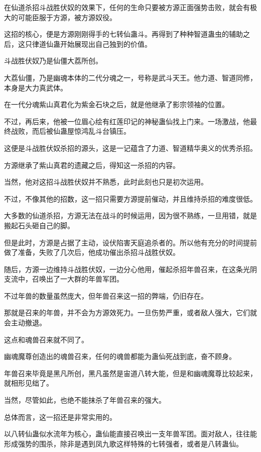 
\begin{this_body}

在仙道杀招斗战胜伏奴的效果下，任何的生命只要被方源正面强势击败，就会有极大的可能臣服于方源，被方源奴役。

这招的核心，便是方源刚刚得手的七转仙蛊斗。再得到了种种智道蛊虫的辅助之后，这只律道仙蛊开始展现出自己独到的价值。

斗战胜伏奴乃是仙僵大荔所创。

大荔仙僵，乃是幽魂本体的二代分魂之一，号称是武斗天王。他力道、智道同修，本身是大力真武体。

在一代分魂紫山真君化为紫金石块之后，就是他继承了影宗领袖的位置。

不过，再后来，他被一位眉心绘有红莲印记的神秘蛊仙找上门来。一场激战，他最终战败，而后被仙蛊屋惊鸿乱斗台镇压。

这便是斗战胜伏奴杀招的源头，这是一记蕴含了力道、智道精华奥义的优秀杀招。

方源继承了紫山真君的遗藏之后，得知这一杀招的内容。

当然，他对这招斗战胜伏奴并不熟悉，此时此刻也只是初次运用。

不过，不像其他的招数，这一招只需要方源提前催动，并且维持杀招的难度很低。

大多数的仙道杀招，方源无法在战斗的时候运用，因为很不熟练，一旦用错，就是搬起石头砸自己的脚。

但是此时，方源是占据了主动，设伏陷害天庭追杀者的。所以他有充分的时间提前做了准备，失败了几次后，他成功催出杀招斗战胜伏奴。

随后，方源一边维持斗战胜伏奴，一边分心他用，催起杀招年兽召来，在这条光阴支流中，召唤出了一大群的年兽军团。

不过年兽的数量虽然庞大，但年兽召来这一招的弊端，仍旧存在。

那就是召来的年兽，并不会为方源效死力。一旦伤势严重，或者敌人强大，它们就会主动撤退。

这点和魂兽召来就不同了。

幽魂魔尊创造出的魂兽召来，任何的魂兽都能为蛊仙死战到底，奋不顾身。

年兽召来毕竟是黑凡所创，黑凡虽然是宙道八转大能，但是和幽魂魔尊比较起来，就相形见绌了。

当然，尽管如此，也绝不能抹杀了年兽召来的强大。

总体而言，这一招还是非常实用的。

以八转仙蛊似水流年为核心，蛊仙能直接召唤出一支年兽军团。面对敌人，往往能形成强势的围杀，除非是遇到凤九歌这样特殊的七转强者，或者是八转蛊仙。


\end{this_body}

